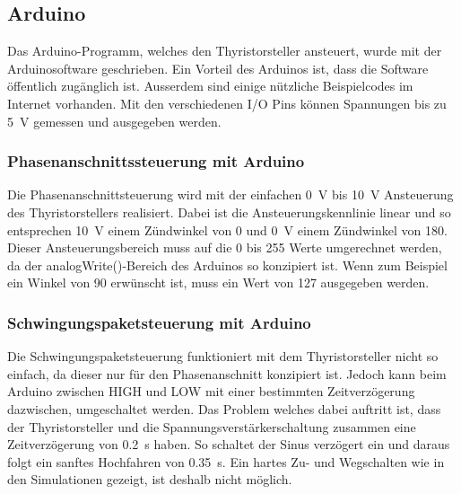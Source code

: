 \subsection{Arduino}

Das Arduino-Programm, welches den Thyristorsteller ansteuert, wurde mit der Arduinosoftware geschrieben. Ein Vorteil des Arduinos ist, dass die Software öffentlich zugänglich ist. Ausserdem sind einige nützliche Beispielcodes im Internet vorhanden. Mit den verschiedenen I/O Pins können Spannungen bis zu \SI{5}{V} gemessen und ausgegeben werden.
 

\subsubsection{Phasenanschnittssteuerung mit Arduino}
Die Phasenanschnittsteuerung wird mit der einfachen \SI{0}{V} bis \SI{10}{V} Ansteuerung des Thyristorstellers realisiert. Dabei ist die Ansteuerungskennlinie linear und so entsprechen \SI{10}{V} einem Zündwinkel von 0\textdegree\hspace{0.02cm} und \SI{0}{V} einem Zündwinkel von 180\textdegree. Dieser Ansteuerungsbereich muss auf die 0 bis 255 Werte umgerechnet werden, da der analogWrite()-Bereich des Arduinos so konzipiert ist. Wenn zum Beispiel ein Winkel von 90\textdegree \hspace{0.02cm} erwünscht ist, muss ein Wert von 127 ausgegeben werden.

\subsubsection{Schwingungspaketsteuerung mit Arduino}
Die Schwingungspaketsteuerung funktioniert mit dem Thyristorsteller nicht so einfach, da dieser nur für den Phasenanschnitt konzipiert ist. Jedoch kann beim Arduino zwischen HIGH und LOW mit einer bestimmten Zeitverzögerung dazwischen, umgeschaltet werden. Das Problem welches dabei auftritt ist, dass der Thyristorsteller und die Spannungsverstärkerschaltung zusammen eine Zeitverzögerung von \SI{0.2}{s} haben. So schaltet der Sinus verzögert ein und daraus folgt ein sanftes Hochfahren von \SI{0.35}{s}. Ein hartes Zu- und Wegschalten wie in den Simulationen gezeigt, ist deshalb nicht möglich.


